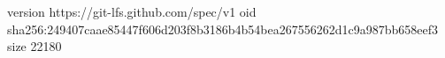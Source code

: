 version https://git-lfs.github.com/spec/v1
oid sha256:249407caae85447f606d203f8b3186b4b54bea267556262d1c9a987bb658eef3
size 22180
